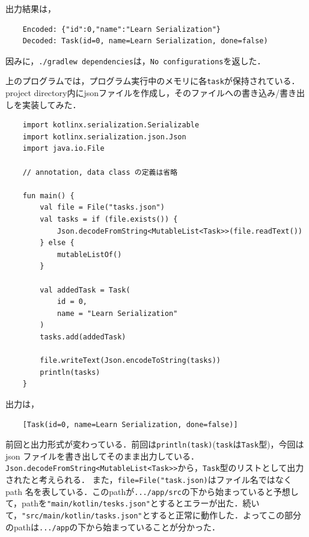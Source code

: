 \documentclass{ltjsarticle}
\begin{document}
出力結果は，
\begin{verbatim}
    Encoded: {"id":0,"name":"Learn Serialization"}
    Decoded: Task(id=0, name=Learn Serialization, done=false)
\end{verbatim}

因みに，\texttt{./gradlew dependencies}は，\texttt{No configurations}を返した．

上のプログラムでは，プログラム実行中のメモリに各\texttt{task}が保持されている．project directory内にjsonファイルを作成し，そのファイルへの書き込み/書き出しを実装してみた．
\begin{verbatim}
    import kotlinx.serialization.Serializable
    import kotlinx.serialization.json.Json
    import java.io.File

    // annotation, data class の定義は省略

    fun main() {
        val file = File("tasks.json")
        val tasks = if (file.exists()) {
            Json.decodeFromString<MutableList<Task>>(file.readText())
        } else {
            mutableListOf()
        }

        val addedTask = Task(
            id = 0,
            name = "Learn Serialization"
        )
        tasks.add(addedTask)

        file.writeText(Json.encodeToString(tasks))
        println(tasks)
    }
\end{verbatim}
出力は，
\begin{verbatim}
    [Task(id=0, name=Learn Serialization, done=false)]
\end{verbatim}
前回と出力形式が変わっている．前回は\texttt{println(task)}(\texttt{task}は\texttt{Task}型)，今回はjson ファイルを書き出してそのまま出力している．\texttt{Json.decodeFromString<MutableList<Task>>}から，\texttt{Task}型のリストとして出力されたと考えられる．
また，\texttt{file=File("task.json)}はファイル名ではなくpath 名を表している．このpathが\texttt{.../app/src}の下から始まっていると予想して，pathを\texttt{"main/kotlin/tesks.json"}とするとエラーが出た．続いて，\texttt{"src/main/kotlin/tasks.json"}とすると正常に動作した．よってこの部分のpathは\texttt{.../app}の下から始まっていることが分かった．
\end{document}
